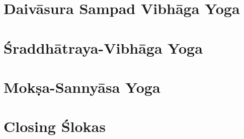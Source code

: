 \documentclass{scrbook}
\begin{document}
\chapter{Daivāsura Sampad Vibhāga Yoga}
\begin{multicols}{2}
    
\end{multicols}

\chapter{Śraddhātraya-Vibhāga Yoga}
\begin{multicols}{2}
    
\end{multicols}

\chapter{Mokṣa-Sannyāsa Yoga}
\begin{multicols}{2}
    
\end{multicols}

\backmatter
\chapter{Closing Ślokas}

\end{document}
